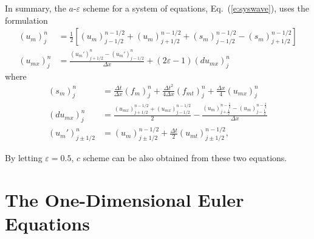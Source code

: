 \documentclass{turgon}
\begin{document}
In summary, the $a$-$\varepsilon$ scheme for a system of equations,
Eq.~(\ref{e:syswave}), uses the formulation \citep{chang_method_1995}
\begin{align}
  (u_m)_j^n &= \frac{1}{2}\left[
      (u_m)_{j-1/2}^{n-1/2} + (u_m)_{j+1/2}^{n-1/2}
    + (s_m)_{j-1/2}^{n-1/2} - (s_m)_{j+1/2}^{n-1/2}
    \right]
  \label{e:sysaeu} \\
  (u_{mx})_j^n &= \frac{(u_m')_{j+1/2}^n-(u_m')_{j-1/2}^n}{\Delta x}
    + (2\varepsilon-1)(du_{mx})_j^n
  \label{e:sysaeux}
\end{align}
where
\begin{align*}
  (s_m)_j^n &=
      \frac{\Delta t}  {\Delta x} (f_m)_j^n
    + \frac{\Delta t^2}{4\Delta x}(f_{mt})_j^n
    + \frac{\Delta x}  {4}        (u_{mx})_j^n \\
  (du_{mx})_j^n &=
      \frac{(u_{mx})_{j+1/2}^{n-1/2}
                  + (u_{mx})_{j-1/2}^{n-1/2}}{2}
    - \frac{(u_m)_{j+\frac{1}{2}}^{n-\frac{1}{2}}
          - (u_m)_{j-\frac{1}{2}}^{n-\frac{1}{2}}}
           {\Delta x} \\
  (u_m')_{j\pm1/2}^n &=
      (u_m)_{j\pm1/2}^{n-1/2}
    + \frac{\Delta t}{2}(u_{mt})_{j\pm1/2}^{n-1/2},
\end{align*}

By letting $\varepsilon=0.5$, $c$ scheme can be also obtained from these two
equations.

\section{The One-Dimensional Euler Equations}
\end{document}
